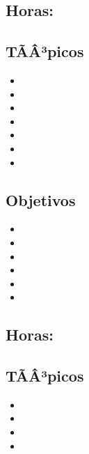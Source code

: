 \subsection{\ARCINCODef}\label{sec:BOK-AR5}
\subsection*{Horas: \ARCINCOHours}

\subsection*{TÃÂ³picos}
\begin{itemize}
	\item \ARCINCOTopicFundamentos
	\item \ARCINCOTopicEstructuras
	\item \ARCINCOTopicAlmacenamiento
	\item \ARCINCOTopicBuses
	\item \ARCINCOTopicIntroduccion
	\item \ARCINCOTopicSoporte
	\item \ARCINCOTopicArquitecturas
\end{itemize}

\subsection*{Objetivos}
\begin{itemize}
	\item \ARCINCOObjUNO
	\item \ARCINCOObjDOS
	\item \ARCINCOObjTRES
	\item \ARCINCOObjCUATRO
	\item \ARCINCOObjCINCO
	\item \ARCINCOObjSEIS
\end{itemize}

\subsection{\ARSEISDef}\label{sec:BOK-AR6}
\subsection*{Horas: \ARSEISHours}

\subsection*{TÃÂ³picos}
\begin{itemize}
	\item \ARSEISTopicImplementacion
	\item \ARSEISTopicUnidad
	\item \ARSEISTopicInstruccion
	\item \ARSEISTopicIntroduccion
\end{itemize}


